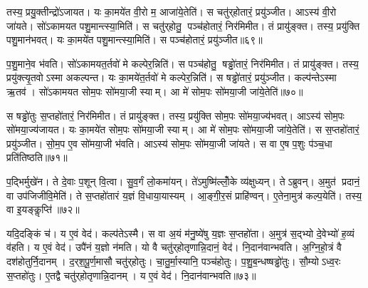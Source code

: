 तस्य॒ प्रयु॒क्तीन्द्रो॑ऽजायत।
यः का॒मये॑त वी॒रो म॒ आजा॑ये॒तेति॑।
स चतु॑र्‌होतारं॒ प्रयु॑ञ्जीत।
आऽस्य॑ वी॒रो जा॑यते।
सो॑ऽकामयत पशु॒मान्त्स्या॒मिति॑।
स चतु॑र्‌होतु॒ पञ्च॑होतारं॒ निर॑मिमीत।
तं प्रायु॑ङ्क्त।
तस्य॒ प्रयु॑क्ति पशु॒मान॑भवत्।
यः का॒मये॑त पशु॒मान्त्स्या॒मिति॑।
स पञ्च॑होतारं॒ प्रयु॑ञ्जीत॥६९॥

प॒शु॒माने॒व भ॑वति।
सो॑ऽकामयत॒र्तवो॑ मे कल्पेर॒न्निति॑।
स पञ्च॑होतु॒ षड्ढो॑तारं॒ निर॑मिमीत।
तं प्रायु॑ङ्क्त।
तस्य॒ प्रयु॑क्त्यृ॒तवोऽस्मा अकल्पन्त।
यः का॒मये॑त॒र्तवो॑ मे कल्पेर॒न्निति॑।
स षड्ढो॑तारं॒ प्रयु॑ञ्जीत।
कल्प॑न्तेऽस्मा ऋ॒तव॑।
सो॑ऽकामयत सोम॒पः सो॑मया॒जी स्याम्।
आ मे॑ सोम॒पः सो॑मया॒जी जा॑ये॒तेति॑॥७०॥

स षड्ढो॑तुः स॒प्तहो॑तारं॒ निर॑मिमीत।
तं प्रायु॑ङ्क्त।
तस्य॒ प्रयु॑क्ति सोम॒पः सो॑मया॒ज्य॑भवत्।
आऽस्य॑ सोम॒पः सो॑मया॒ज्य॑जायत।
यः का॒मये॑त सोम॒पः सो॑मया॒जी स्याम्।
आ मे॑ सोम॒पः सो॑मया॒जी जा॑ये॒तेति॑।
स स॒प्तहो॑तारं॒ प्रयु॑ञ्जीत।
सो॒म॒प ए॒व सो॑मया॒जी भ॑वति।
आऽस्य॑ सोम॒पः सो॑मया॒जी जा॑यते।
स वा ए॒ष प॒शुः प॑ञ्च॒धा प्रति॑तिष्ठति॥७१॥

प॒द्भिर्मुखे॑न।
ते दे॒वाः प॒शून् वि॒त्वा।
सु॒व॒र्गं लो॒कमा॑यन्।
ते॑ऽमुष्मि॑ल्लोँ॒के व्य॑क्षुध्यन्।
तेऽब्रुवन्।
अ॒मुत॑ प्रदानं॒ वा उप॑जिजीवि॒मेति॑।
ते स॒प्तहो॑तारं य॒ज्ञं वि॒धाया॒यास्यम्।
आ॒ङ्गी॒र॒सं प्राहि॑ण्वन्।
ए॒तेना॒मुत्र॑ कल्प॒येति॑।
तस्य॒ वा इ॒यङ्कॢप्ति॑॥७२॥

यदि॒दङ्किं च॑।
य ए॒वं वेद॑।
कल्प॑तेऽस्मै।
स वा अ॒यं म॑नु॒ष्ये॑षु य॒ज्ञः स॒प्तहो॑ता।
अ॒मुत्र॑ स॒द्भ्यो दे॒वेभ्यो॑ ह॒व्यं व॑हति।
य ए॒वं वेद॑।
उपै॑नं य॒ज्ञो न॑मति।
यो वै चतु॑र्‌होतृणान्नि॒दानं॒ वेद॑।
नि॒दान॑वान्भवति।
अ॒ग्नि॒हो॒त्रं वै दश॑होतुर्नि॒दानम्।
द॒र्‌श॒पू॒र्ण॒मासौ चतु॑र्‌होतुः।
चा॒तु॒र्मा॒स्यानि॒ पञ्च॑होतुः।
प॒शु॒ब॒न्धष्षड्ढो॑तुः।
सौ॒म्योऽध्व॒रः स॒प्तहो॑तुः।
ए॒तद्वै चतु॑र्‌होतृणान्नि॒दानम्।
य ए॒वं वेद॑।
नि॒दान॑वान्भवति॥७३॥\anuvakamend[अ॒मि॒मी॒त॒ तं प्रायु॑ङ्क्त॒ पञ्च॑होतारं॒ प्र यु॑ञ्जीत जाये॒तेति॑ तिष्ठति॒ कॢप्ति॒र्दश॑होतुर्नि॒दान स॒प्त च॑]




\clearpage
{}
\setcounter{anuvakam}{0}


